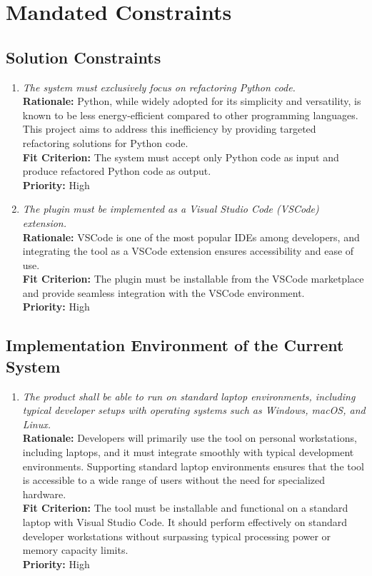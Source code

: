 \documentclass[12pt]{article}
\begin{document}
\section{Mandated Constraints}
\subsection{Solution Constraints}
\begin{enumerate}[label=MD-SL \arabic*., wide=0pt, leftmargin=*]
  \item \emph{The system must exclusively focus on refactoring Python
    code.}\\[2mm]
    {\bf Rationale:} Python, while widely adopted for its simplicity
    and versatility, is known to be less energy-efficient compared to
    other programming languages. This project aims to address this
    inefficiency by providing targeted refactoring solutions for Python code.\\
    {\bf Fit Criterion:} The system must accept only Python code as
    input and produce refactored Python code as output.\\
    {\bf Priority:} High

  \item \emph{The plugin must be implemented as a Visual Studio Code
    (VSCode) extension.}\\[2mm]
    {\bf Rationale:} VSCode is one of the most popular IDEs among
    developers, and integrating the tool as a VSCode extension
    ensures accessibility and ease of use.\\
    {\bf Fit Criterion:} The plugin must be installable from the
    VSCode marketplace and provide seamless integration with the
    VSCode environment.\\
    {\bf Priority:} High
\end{enumerate}

\subsection{Implementation Environment of the Current System}
\begin{enumerate}[label=MD-EC \arabic*., wide=0pt, leftmargin=*]
  \item \emph{The product shall be able to run on standard laptop
      environments, including typical developer setups with operating
    systems such as Windows, macOS, and Linux.}\\[2mm]
    {\bf Rationale:} Developers will primarily use the tool on
    personal workstations, including laptops, and it must integrate
    smoothly with typical development environments. Supporting
    standard laptop environments ensures that the tool is accessible
    to a wide range of users without the need for specialized hardware.\\
    {\bf Fit Criterion:} The tool must be installable and functional
    on a standard laptop with Visual Studio Code. It should perform
    effectively on standard developer workstations without surpassing
    typical processing power or memory capacity limits.\\
    {\bf Priority:} High
\end{enumerate}
\end{document}

